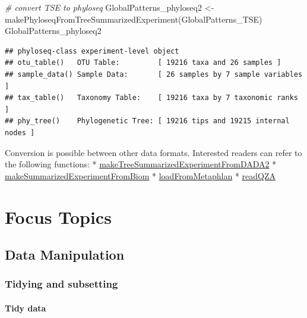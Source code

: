 \documentclass[
]{book}
\newenvironment{Shaded}{\begin{snugshade}}{\end{snugshade}}
\newcommand{\CommentTok}[1]{\textcolor[rgb]{0.56,0.35,0.01}{\textit{#1}}}
\newcommand{\FunctionTok}[1]{\textcolor[rgb]{0.00,0.00,0.00}{#1}}
\newcommand{\NormalTok}[1]{#1}
\newcommand{\OtherTok}[1]{\textcolor[rgb]{0.56,0.35,0.01}{#1}}
\begin{document}
\begin{Shaded}
\begin{Highlighting}[]
\CommentTok{\# convert TSE to phyloseq}
\NormalTok{GlobalPatterns\_phyloseq2 }\OtherTok{\textless{}{-}} \FunctionTok{makePhyloseqFromTreeSummarizedExperiment}\NormalTok{(GlobalPatterns\_TSE) }
\NormalTok{GlobalPatterns\_phyloseq2}
\end{Highlighting}
\end{Shaded}

\begin{verbatim}
## phyloseq-class experiment-level object
## otu_table()   OTU Table:         [ 19216 taxa and 26 samples ]
## sample_data() Sample Data:       [ 26 samples by 7 sample variables ]
## tax_table()   Taxonomy Table:    [ 19216 taxa by 7 taxonomic ranks ]
## phy_tree()    Phylogenetic Tree: [ 19216 tips and 19215 internal nodes ]
\end{verbatim}

Conversion is possible between other data formats. Interested readers can refer to the following functions:
* \href{https://microbiome.github.io/mia/reference/makeTreeSummarizedExperimentFromDADA2.html}{makeTreeSummarizedExperimentFromDADA2}
* \href{https://microbiome.github.io/mia/reference/makeSummarizedExperimentFromBiom.html}{makeSummarizedExperimentFromBiom}
* \href{https://microbiome.github.io/mia/reference/loadFromMetaphlan.html}{loadFromMetaphlan}
* \href{https://microbiome.github.io/mia/reference/loadFromQIIME2.html}{readQZA}

\hypertarget{part-focus-topics}{%
\part{Focus Topics}\label{part-focus-topics}}

\hypertarget{datamanipulation}{%
\chapter{Data Manipulation}\label{datamanipulation}}

\hypertarget{tidying-and-subsetting}{%
\section{Tidying and subsetting}\label{tidying-and-subsetting}}

\hypertarget{tidy-data}{%
\subsection{Tidy data}\label{tidy-data}}
\end{document}
